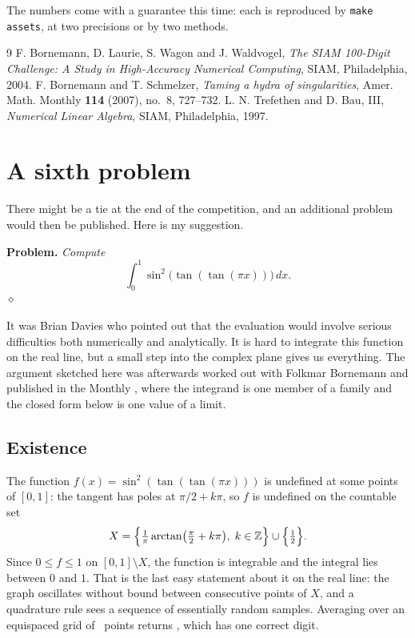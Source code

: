 \documentclass[11pt]{article}
\newcommand{\diam}{\hfill$\diamond$}
\begin{document}
The numbers come with a guarantee this time: each is reproduced by
\texttt{make assets}, at two precisions or by two methods.

\begin{thebibliography}{9}
 F. Bornemann, D. Laurie, S. Wagon and J. Waldvogel,
\emph{The SIAM 100-Digit Challenge: A Study in High-Accuracy Numerical
Computing}, SIAM, Philadelphia, 2004.
 F. Bornemann and T. Schmelzer, \emph{Taming a hydra of
singularities}, Amer. Math. Monthly \textbf{114} (2007), no.~8, 727--732.
 L. N. Trefethen and D. Bau, III, \emph{Numerical Linear
Algebra}, SIAM, Philadelphia, 1997.
\end{thebibliography}

\appendix
\section{A sixth problem}
There might be a tie at the end of the competition, and an additional
problem would then be published. Here is my suggestion.

\noindent\textbf{Problem.} \emph{Compute}
\begin{equation}\label{eq:integral}
   \int_0^1 \sin^2\bigl(\tan(\tan(\pi x))\bigr)\,dx .
\end{equation}
\vspace{-1.5\baselineskip}\diam

It was Brian Davies who pointed out that the evaluation would involve
serious difficulties both numerically and analytically. It is hard to
integrate this function on the real line, but a small step into the complex
plane gives us everything. The argument sketched here was afterwards worked
out with Folkmar Bornemann and published in the Monthly \cite{hydra}, where
the integrand is one member of a family and the closed form below is one
value of a limit.

\subsection{Existence}
The function $f(x) = \sin^2(\tan(\tan(\pi x)))$ is undefined at some points
of $[0,1]$: the tangent has poles at $\pi/2 + k\pi$, so $f$ is undefined on
the countable set
\[
   X = \Bigl\{\tfrac{1}{\pi}\arctan\bigl(\tfrac{\pi}{2}+k\pi\bigr),
   \;k\in\mathbb{Z}\Bigr\}\cup\Bigl\{\tfrac{1}{2}\Bigr\} .
\]
Since $0 \le f \le 1$ on $[0,1]\setminus X$, the function is integrable and
the integral lies between $0$ and $1$. That is the last easy statement about
it on the real line: the graph oscillates without bound between consecutive
points of $X$, and a quadrature rule sees a sequence of essentially random
samples. Averaging over an equispaced grid of \integralgrid\ points returns
\integralnaive, which has one correct digit.
\end{document}
